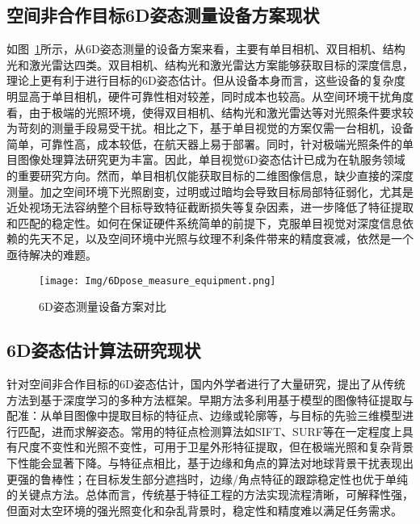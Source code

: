 \subsection{空间非合作目标6D姿态测量设备方案现状}
如图~\ref{fig:6D_equip}所示，从6D姿态测量的设备方案来看，主要有单目相机\cite{PAULY2023339, 9802504,Zhang_2024_CVPR,Liu_2024_CVPR}、双目相机\cite{GXXB202106018, zhang2017optimization,Fan2024}、结构光\cite{laser_stereo,hu2023non,sun2022relative}和激光雷达\cite{10801205,10823741}四类。双目相机、结构光和激光雷达方案能够获取目标的深度信息，理论上更有利于进行目标的6D姿态估计。但从设备本身而言，这些设备的复杂度明显高于单目相机，硬件可靠性相对较差，同时成本也较高。从空间环境干扰角度看，由于极端的光照环境，使得双目相机、结构光和激光雷达等对光照条件要求较为苛刻的测量手段易受干扰\cite{rs15092286,tian2023all}。相比之下，基于单目视觉的方案仅需一台相机，设备简单，可靠性高，成本较低，在航天器上易于部署。同时，针对极端光照条件的单目图像处理算法研究更为丰富。因此，单目视觉6D姿态估计已成为在轨服务领域的重要研究方向。然而，单目相机仅能获取目标的二维图像信息，缺少直接的深度测量。加之空间环境下光照剧变，过明或过暗均会导致目标局部特征弱化，尤其是近处视场无法容纳整个目标导致特征截断损失等复杂因素，进一步降低了特征提取和匹配的稳定性\cite{Hu_2021_CVPR,wang2022revisiting}。如何在保证硬件系统简单的前提下，克服单目视觉对深度信息依赖的先天不足，以及空间环境中光照与纹理不利条件带来的精度衰减，依然是一个亟待解决的难题。
\begin{figure}[htbp]
	\centering
	\texttt{[image: Img/6Dpose\_measure\_equipment.png]}
	\caption{6D姿态测量设备方案对比}
	\label{fig:6D_equip}
\end{figure}


\subsection{6D姿态估计算法研究现状}
针对空间非合作目标的6D姿态估计，国内外学者进行了大量研究，提出了从传统方法到基于深度学习的多种方法框架。早期方法多利用基于模型的图像特征提取与配准：从单目图像中提取目标的特征点、边缘或轮廓等，与目标的先验三维模型进行匹配，进而求解姿态。常用的特征点检测算法如SIFT\citep{sift}、SURF\cite{bay2006surf}等在一定程度上具有尺度不变性和光照不变性，可用于卫星外形特征提取，但在极端光照和复杂背景下性能会显著下降。与特征点相比，基于边缘和角点的算法对地球背景干扰表现出更强的鲁棒性；在目标发生部分遮挡时，边缘/角点特征的跟踪稳定性也优于单纯的关键点方法。总体而言，传统基于特征工程的方法实现流程清晰，可解释性强，但面对太空环境的强光照变化和杂乱背景时，稳定性和精度难以满足任务需求。

